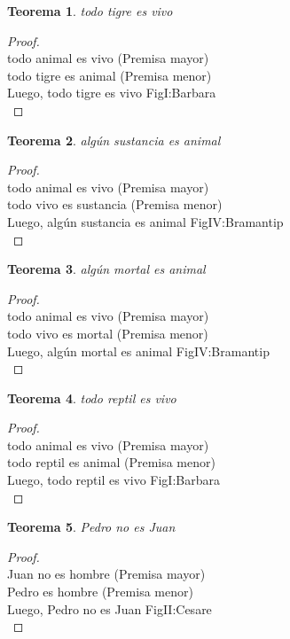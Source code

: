 ﻿\documentclass[12pt]{book}
\newtheorem{theorem}{Teorema}[chapter]
\newtheorem{proof}{Demostración}
\begin{document}
\begin{theorem}
todo tigre es vivo
\label{th: 16}
\end{theorem}\begin{proof}\\todo animal es vivo	 (Premisa mayor) \\todo tigre es animal	 (Premisa menor) \\Luego, todo tigre es vivo	FigI:Barbara \\ \end{proof}
\begin{theorem}
algún sustancia es animal
\label{th: 17}
\end{theorem}\begin{proof}\\todo animal es vivo	 (Premisa mayor) \\todo vivo es sustancia	 (Premisa menor) \\Luego, algún sustancia es animal	FigIV:Bramantip \\ \end{proof}
\begin{theorem}
algún mortal es animal
\label{th: 18}
\end{theorem}\begin{proof}\\todo animal es vivo	 (Premisa mayor) \\todo vivo es mortal	 (Premisa menor) \\Luego, algún mortal es animal	FigIV:Bramantip \\ \end{proof}
\begin{theorem}
todo reptil es vivo
\label{th: 19}
\end{theorem}\begin{proof}\\todo animal es vivo	 (Premisa mayor) \\todo reptil es animal	 (Premisa menor) \\Luego, todo reptil es vivo	FigI:Barbara \\ \end{proof}
\begin{theorem}
Pedro no es Juan
\label{th: 20}
\end{theorem}\begin{proof}\\Juan no es hombre	 (Premisa mayor) \\Pedro es hombre	 (Premisa menor) \\Luego, Pedro no es Juan	FigII:Cesare \\ \end{proof}
\end{document}
